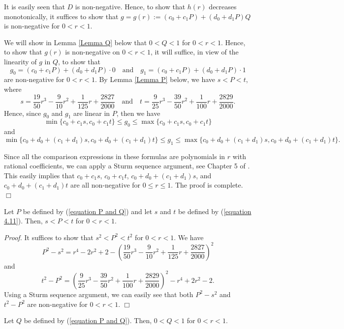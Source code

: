 \documentclass[mn,a4paper,fleqn]{w-art}
\newcommand{\be}{\begin{equation}}
\newcommand{\ee}{\end{equation}}
\newcommand{\bl}{\begin{lemma}}
\newcommand{\el}{\end{lemma}}
\begin{document}
{It is easily seen that $D$ is non-negative.  Hence, to show that
$h(r)$ decreases monotonically, it suffices to show that $g=g(r):=
(c_0 + c_1P)+ (d_0 + d_1P)Q$ is non-negative for $0<r<1$.

We will show in Lemma \ref{Lemma Q} below that $0 < Q < 1$ for $0
< r < 1$.  Hence, to show that $g(r)$ is non-negative on $0<r<1$,
it will suffice, in view of the linearity of $g$ in $Q$, to show that
$$  %
g_0 = (c_0 + c_1P)+ (d_0 + d_1P) \cdot 0 \quad {\mbox{and}}  \quad
g_1 = (c_0 + c_1P)+ (d_0 + d_1P) \cdot 1  %
$$  %
are non-negative for $0<r<1$.  By Lemma \ref{Lemma P} below, we
have $s < P < t$, where %
\be  \label{equation 4.11}%
s =
\frac{19}{50}r^3-\frac{9}{10}r^2+\frac{1}{125}r+\frac{2827}{2000}
\quad {\mbox{and}} \quad  t =
\frac{9}{25}r^3-\frac{39}{50}r^2+\frac{1}{100}r+\frac{2829}{2000}. %
\ee %
 Hence, since $g_0$ and $g_1$ are linear in $P$, then we have %
$$  %
\min\{c_0+c_1s,c_0+c_1t\}\le g_0\le \max\{c_0+c_1s,c_0+c_1t\}  %
$$  %
and %
$$  %
\min\{c_0+d_0+(c_1+d_1)s,c_0+d_0+(c_1+d_1)t\}\le g_1\le
\max\{c_0+d_0+(c_1+d_1)s,c_0+d_0+(c_1+d_1)t\}.  %
$$  %



Since all the comparison expressions in these formulas are
polynomials in $r$ with rational coefficients, we can apply
 a Sturm sequence argument, see Chapter 5 of \cite{J}.
 This easily implies that $c_0+c_1s$, $c_0+c_1t$, $c_0+d_0+(c_1+d_1)s$, and $c_0+d_0+(c_1+d_1)t$
 are all non-negative for $0 \le r \le 1$. The proof is complete.  \hfill  $\Box$  %


\bl \label{Lemma P} %
Let $P$ be defined by (\ref{equation P and Q}) and let $s$ and $t$ be
defined by (\ref{equation 4.11}). Then, $s < P < t$ for $0 < r < 1$. %
\el  %

\textit{Proof.}  It suffices to show that $s^2 < P^2 < t^2$ for $0
< r < 1$.  We have %
$$   %
P^2 - s^2 =  r^4 - 2r^2 + 2-
\left(\frac{19}{50}r^3-\frac{9}{10}r^2+\frac{1}{125}r+\frac{2827}{2000}\right)^2  %
$$  %
and %
$$  %
 t^2 - P^2 =
\left(\frac{9}{25}r^3-\frac{39}{50}r^2+\frac{1}{100}r+\frac{2829}{2000}\right)^2-r^4+2r^2-2. %
$$   %
Using a Sturm sequence argument, we can easily see that both $P^2
- s^2$ and $t^2 - P^2$ are non-negative for $0 < r < 1$. \hfill
$\Box$



\bl \label{Lemma Q} Let $Q$ be defined by (\ref{equation P and Q}).
Then, $ 0 < Q < 1 $ for $0 < r < 1$. \el

}
\end{document}
